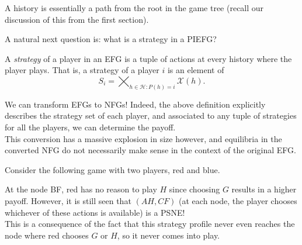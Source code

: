 	A history is essentially a path from the root in the game tree (recall our discussion of this from the first section).

	A natural next question is: what is a strategy in a PIEFG?

	\begin{fdef}[Strategy]
		A \emph{strategy} of a player in an EFG is a tuple of actions at every history where the player plays. That is, a strategy of a player $i$ is an element of
		\[ S_i = \bigtimes_{h \in \mathcal{H} : P(h) = i} \mathcal{X}(h). \]
	\end{fdef}

	We can transform EFGs to NFGs! Indeed, the above definition explicitly describes the strategy set of each player, and associated to any tuple of strategies for all the players, we can determine the payoff.\\
	This conversion has a massive explosion in size however, and equilibria in the converted NFG do not necessarily make sense in the context of the original EFG.

	\begin{fex}
		Consider the following game with two players, red and blue.
		\begin{center}
		\end{center}
		At the node BF, red has no reason to play $H$ since choosing $G$ results in a higher payoff. However, it is still seen that $(AH,CF)$ (at each node, the player chooses whichever of these actions is available) is a PSNE!\\
		This is a consequence of the fact that this strategy profile never even reaches the node where red chooses $G$ or $H$, so it never comes into play.
	\end{fex}


